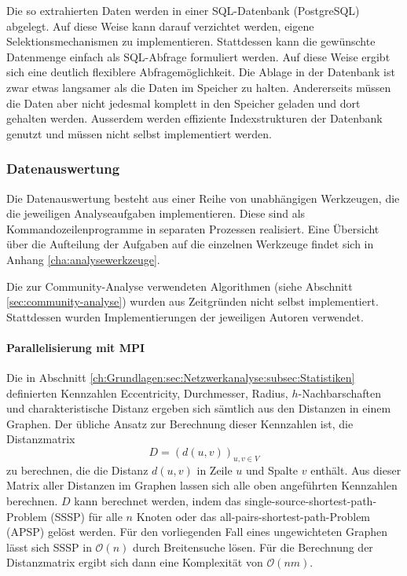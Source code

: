 Die so extrahierten Daten werden in einer SQL-Datenbank (PostgreSQL)
abgelegt. Auf diese Weise kann darauf verzichtet werden, eigene
Selektionsmechanismen zu implementieren. Stattdessen kann die
gewünschte Datenmenge einfach als SQL-Abfrage formuliert werden. Auf
diese Weise ergibt sich eine deutlich flexiblere
Abfragemöglichkeit. Die Ablage in der Datenbank ist zwar etwas
langsamer als die Daten im Speicher zu halten. Andererseits müssen die
Daten aber nicht jedesmal komplett in den Speicher geladen und dort
gehalten werden. Ausserdem werden effiziente Indexstrukturen der
Datenbank genutzt und müssen nicht selbst implementiert werden.

\subsubsection{Datenauswertung}
\label{sec:datenauswertung}

Die Datenauswertung besteht aus einer Reihe von unabhängigen
Werkzeugen, die die jeweiligen Analyseaufgaben implementieren. Diese
sind als Kommandozeilenprogramme in separaten Prozessen
realisiert. Eine \"Ubersicht \"uber die Aufteilung der Aufgaben auf
die einzelnen Werkzeuge findet sich in Anhang
\ref{cha:analysewerkzeuge}.

Die zur Community-Analyse verwendeten Algorithmen (siehe Abschnitt
\ref{sec:community-analyse}) wurden aus Zeitgr\"unden nicht selbst
implementiert. Stattdessen wurden Implementierungen der jeweiligen
Autoren verwendet.

\paragraph{Parallelisierung mit MPI}
\label{sec:parall-mitt-mpi}

Die in Abschnitt
\ref{ch:Grundlagen:sec:Netzwerkanalyse:subsec:Statistiken} definierten
Kennzahlen Eccentricity, Durchmesser, Radius, $h$-Nachbarschaften und
charakteristische Distanz ergeben sich s\"amtlich aus den Distanzen in
einem Graphen. Der \"ubliche Ansatz zur Berechnung dieser Kennzahlen
ist, die Distanzmatrix
\begin{equation}
  \label{eq:7}
  D = (d(u, v))_{u, v\in V}
\end{equation}
zu berechnen, die die Distanz $d(u, v)$ in Zeile $u$ und Spalte $v$
enth\"alt\cite{Brinkmeier2004}. Aus dieser Matrix aller Distanzen im
Graphen lassen sich alle oben angef\"uhrten Kennzahlen berechnen. $D$
kann berechnet werden, indem das single-source-shortest-path-Problem
(SSSP) f\"ur alle $n$ Knoten oder das all-pairs-shortest-path-Problem
(APSP) gel\"ost werden. F\"ur den vorliegenden Fall eines
ungewichteten Graphen l\"asst sich SSSP in $\mathcal{O}(n)$ durch
Breitensuche l\"osen. F\"ur die Berechnung der Distanzmatrix ergibt
sich dann eine Komplexit\"at von $\mathcal{O}(nm)$.

